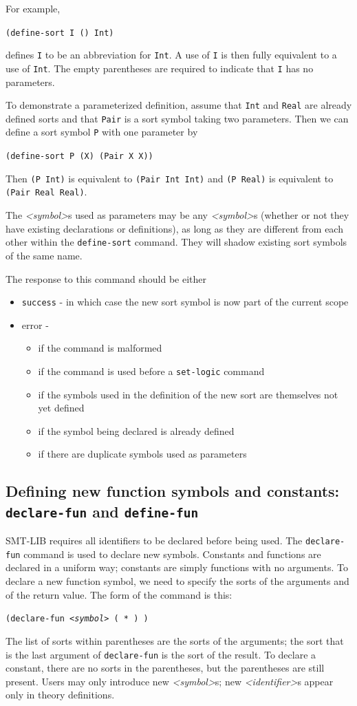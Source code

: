 \documentclass[12pt,oneside]{report}
\newcommand{\sym}{{\it <symbol>}}
\newcommand{\ID}{{\it <identifier>}}
\newcommand{\Sort}{{\it <sort-expr>}}
\newcommand{\nospace}{\setlength{\itemsep}{0in}\setlength{\parsep}{0in}\setlength{\parskip}{0in}\setlength{\topsep}{0in}}
\begin{document}
For example, \\
\centerline{\tt (define-sort I () Int)}
defines {\tt I} to be an abbreviation for {\tt Int}.  A use of {\tt I} is then fully equivalent to a use of {\tt Int}.  The empty parentheses are required to indicate that {\tt I} has no parameters.

To demonstrate a parameterized definition, assume that {\tt Int} and {\tt Real} are already defined sorts and that {\tt Pair} is a sort symbol taking two parameters.  Then we can define a sort symbol {\tt P} with one parameter by\\
\centerline{\tt (define-sort P (X) (Pair X X))}
Then {\tt (P Int)} is equivalent to {\tt (Pair Int Int)} and {\tt (P Real)} is equivalent to {\tt (Pair Real Real)}.

The \sym s used as parameters may be any \sym s
(whether or not they have existing declarations
or definitions), as long as they are different
from each other within the {\tt define-sort} command.
They will shadow existing sort symbols of the same name.

The response to this command should be either
\begin{itemize} \nospace
\item {\tt success} - in which case the new sort symbol is now part of the current scope
\item error - 
\begin{itemize} \nospace
\item if the command is malformed
\item if the command is used before a {\tt set-logic} command
\item if the symbols used in the definition of the new sort are themselves not yet defined
\item if the symbol being declared is already defined
\item if there are duplicate symbols used as parameters
\end{itemize}
\end{itemize}


\subsection{Defining new function symbols and constants: {\tt declare-fun} and {\tt define-fun}}
\label{DeclarationCommands}

SMT-LIB requires all identifiers to be declared before being used.
The {\tt declare-fun} command is used to declare new symbols.
Constants and functions are declared in a uniform way; constants are
simply functions with no arguments.  To declare a new function symbol,
we need to specify the sorts of the arguments and of the return value.
The form of the command is this:\\
\centerline{\tt (declare-fun \sym\ ( \Sort* ) \Sort )}
The list of sorts within parentheses are the sorts of the arguments; the sort that is
the last argument of {\tt declare-fun} is the sort of the result.  To declare
a constant, there are no sorts in the parentheses, but the parentheses are 
still present. Users may only introduce new \sym s; new \ID s appear only in
theory definitions.
\end{document}
